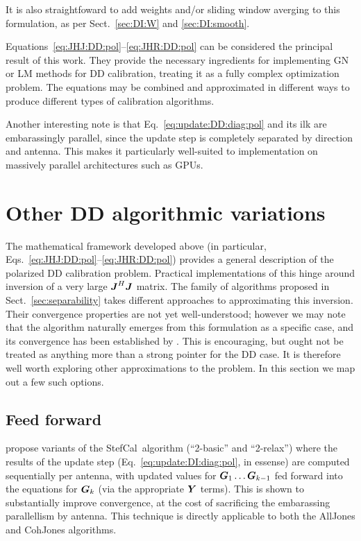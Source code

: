 \documentclass[useAMS,usenatbib]{mn2e}
\newcommand{\mat}[1]{{\bmath{#1}}}
\newcommand{\JJ}{\mat{J}} %
\newcommand{\GG}{\mat{G}}
\newcommand{\JHJ}{\JJ^H\JJ} %
\newcommand{\StefCal}{{\sc StefCal}}
\numberwithin{equation}{section}
\begin{document}
It is also straightfoward to add weights and/or sliding window averging to this formulation, as per 
Sect.~\ref{sec:DI:W} and \ref{sec:DI:smooth}.

Equations~\ref{eq:JHJ:DD:pol}--\ref{eq:JHR:DD:pol} can be considered the principal result of this work.
They provide the necessary ingredients for implementing GN or LM methods for DD calibration, treating it as a 
fully complex optimization problem. The equations may be combined and approximated in different 
ways to produce different types of calibration algorithms. 

Another interesting note is that Eq.~\ref{eq:update:DD:diag:pol} and its ilk are embarassingly parallel, since the update step is 
completely separated by direction and antenna. This makes it particularly well-suited to implementation on massively 
parallel architectures such as GPUs.

\section{Other DD algorithmic variations}
\label{sec:variations}

The mathematical framework developed above (in particular, Eqs.~\ref{eq:JHJ:DD:pol}--\ref{eq:JHR:DD:pol}) provides
a general description of the polarized DD calibration problem. Practical implementations of this hinge around inversion of
a very large $\JHJ$ matrix. The family of algorithms proposed in Sect.~\ref{sec:separability} takes different approaches
to approximating this inversion. Their convergence properties are not yet well-understood; however we may note that 
the {\sc \StefCal} algorithm naturally emerges from this formulation as a specific case, and its convergence has been 
established by \citet{Stefcal}. This is encouraging, but ought not be treated as anything more than a strong pointer for 
the DD case. It is therefore well worth exploring other approximations to the problem. In this section we map out a few 
such options.

\subsection{Feed forward}
\label{sec:feed-forward}

\citet{Stefcal-URSI} propose variants of the \StefCal\ algorithm (``2-basic'' and ``2-relax'') where the results of the 
update step (Eq.~\ref{eq:update:DI:diag:pol}, in essense) are computed sequentially per antenna, with updated
values for $\GG_1\dots\GG_{k-1}$ fed forward into the equations for $\GG_k$ (via the appropriate $\YY$ terms). This is shown to 
substantially improve convergence, at the cost of sacrificing the embarassing parallellism by antenna. This technique 
is directly applicable to both the {\sc AllJones} and {\sc CohJones} algorithms. 
\end{document}
